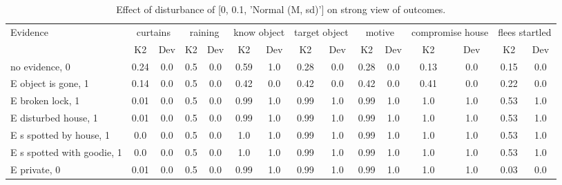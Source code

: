 \begin{table}\begin{tabular}{l|cc|cc|cc|cc|cc|cc|cc}\toprule\multirow{2}{*}{Evidence} & \multicolumn{2}{c}{curtains}& \multicolumn{2}{c}{raining}& \multicolumn{2}{c}{know object}& \multicolumn{2}{c}{target object}& \multicolumn{2}{c}{motive}& \multicolumn{2}{c}{compromise house}& \multicolumn{2}{c}{flees startled}\\& {K2} & {Dev}& {K2} & {Dev}& {K2} & {Dev}& {K2} & {Dev}& {K2} & {Dev}& {K2} & {Dev}& {K2} & {Dev}\\\midrule
no evidence, 0 & \cellcolor{Bittersweet}0.24&\cellcolor{Bittersweet}0.0&0.5&0.0&0.59&1.0&\cellcolor{Bittersweet}0.28&\cellcolor{Bittersweet}0.0&\cellcolor{Bittersweet}0.28&\cellcolor{Bittersweet}0.0&\cellcolor{Bittersweet}0.13&\cellcolor{Bittersweet}0.0&\cellcolor{Bittersweet}0.15&\cellcolor{Bittersweet}0.0\\E object is gone, 1 & \cellcolor{Bittersweet}0.14&\cellcolor{Bittersweet}0.0&0.5&0.0&\cellcolor{Bittersweet}0.42&\cellcolor{Bittersweet}0.0&0.42&0.0&0.42&0.0&\cellcolor{Bittersweet}0.41&\cellcolor{Bittersweet}0.0&\cellcolor{Bittersweet}0.22&\cellcolor{Bittersweet}0.0\\E broken lock, 1 & \cellcolor{Bittersweet}0.01&\cellcolor{Bittersweet}0.0&0.5&0.0&\cellcolor{Bittersweet}0.99&\cellcolor{Bittersweet}1.0&\cellcolor{Bittersweet}0.99&\cellcolor{Bittersweet}1.0&\cellcolor{Bittersweet}0.99&\cellcolor{Bittersweet}1.0&\cellcolor{Bittersweet}1.0&\cellcolor{Bittersweet}1.0&0.53&1.0\\E disturbed house, 1 & \cellcolor{Bittersweet}0.01&\cellcolor{Bittersweet}0.0&0.5&0.0&\cellcolor{Bittersweet}0.99&\cellcolor{Bittersweet}1.0&\cellcolor{Bittersweet}0.99&\cellcolor{Bittersweet}1.0&\cellcolor{Bittersweet}0.99&\cellcolor{Bittersweet}1.0&\cellcolor{Bittersweet}1.0&\cellcolor{Bittersweet}1.0&0.53&1.0\\E s spotted by house, 1 & \cellcolor{Bittersweet}0.0&\cellcolor{Bittersweet}0.0&0.5&0.0&\cellcolor{Bittersweet}1.0&\cellcolor{Bittersweet}1.0&\cellcolor{Bittersweet}0.99&\cellcolor{Bittersweet}1.0&\cellcolor{Bittersweet}0.99&\cellcolor{Bittersweet}1.0&\cellcolor{Bittersweet}1.0&\cellcolor{Bittersweet}1.0&0.53&1.0\\E s spotted with goodie, 1 & \cellcolor{Bittersweet}0.0&\cellcolor{Bittersweet}0.0&0.5&0.0&\cellcolor{Bittersweet}1.0&\cellcolor{Bittersweet}1.0&\cellcolor{Bittersweet}0.99&\cellcolor{Bittersweet}1.0&\cellcolor{Bittersweet}0.99&\cellcolor{Bittersweet}1.0&\cellcolor{Bittersweet}1.0&\cellcolor{Bittersweet}1.0&0.53&1.0\\E private, 0 & \cellcolor{Bittersweet}0.01&\cellcolor{Bittersweet}0.0&0.5&0.0&\cellcolor{Bittersweet}0.99&\cellcolor{Bittersweet}1.0&\cellcolor{Bittersweet}0.99&\cellcolor{Bittersweet}1.0&\cellcolor{Bittersweet}0.99&\cellcolor{Bittersweet}1.0&\cellcolor{Bittersweet}1.0&\cellcolor{Bittersweet}1.0&\cellcolor{Bittersweet}0.03&\cellcolor{Bittersweet}0.0\\\bottomrule\end{tabular}\caption{Effect of disturbance of [0, 0.1, 'Normal (M, sd)'] on strong view of outcomes.}\end{table}